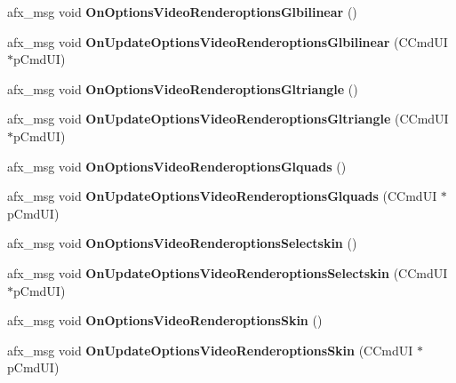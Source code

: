 \begin{DoxyCompactItemize}
afx\+\_\+msg void {\bfseries On\+Options\+Video\+Renderoptions\+Glbilinear} ()
\item 
\mbox{\label{class_main_wnd_a164bd7358a8e4bab78e3b9378914e533}} 
afx\+\_\+msg void {\bfseries On\+Update\+Options\+Video\+Renderoptions\+Glbilinear} (C\+Cmd\+UI $\ast$p\+Cmd\+UI)
\item 
\mbox{\label{class_main_wnd_a80f5fb3891f417bc919adc26f5773a08}} 
afx\+\_\+msg void {\bfseries On\+Options\+Video\+Renderoptions\+Gltriangle} ()
\item 
\mbox{\label{class_main_wnd_ac7ba8a582332e116ac1619d9fcbdafc8}} 
afx\+\_\+msg void {\bfseries On\+Update\+Options\+Video\+Renderoptions\+Gltriangle} (C\+Cmd\+UI $\ast$p\+Cmd\+UI)
\item 
\mbox{\label{class_main_wnd_adc9d14bd286462fdf5f04111352de799}} 
afx\+\_\+msg void {\bfseries On\+Options\+Video\+Renderoptions\+Glquads} ()
\item 
\mbox{\label{class_main_wnd_a4914ee86ae355c18c88b733db04529bb}} 
afx\+\_\+msg void {\bfseries On\+Update\+Options\+Video\+Renderoptions\+Glquads} (C\+Cmd\+UI $\ast$p\+Cmd\+UI)
\item 
\mbox{\label{class_main_wnd_a38b0a1dbd8af4407e43866565ffb9bad}} 
afx\+\_\+msg void {\bfseries On\+Options\+Video\+Renderoptions\+Selectskin} ()
\item 
\mbox{\label{class_main_wnd_a313b7202736612b30754e6b321246f28}} 
afx\+\_\+msg void {\bfseries On\+Update\+Options\+Video\+Renderoptions\+Selectskin} (C\+Cmd\+UI $\ast$p\+Cmd\+UI)
\item 
\mbox{\label{class_main_wnd_a5f44893bd6c5452bbd514c034ee15fbd}} 
afx\+\_\+msg void {\bfseries On\+Options\+Video\+Renderoptions\+Skin} ()
\item 
\mbox{\label{class_main_wnd_a2ad43f4ad55a02c28d1c288c4b5afe7c}} 
afx\+\_\+msg void {\bfseries On\+Update\+Options\+Video\+Renderoptions\+Skin} (C\+Cmd\+UI $\ast$p\+Cmd\+UI)
\item 
\mbox{\label{class_main_wnd_ad3e0c95642b4f96e97e699f67e6e8d39}} 

\end{DoxyCompactItemize}
